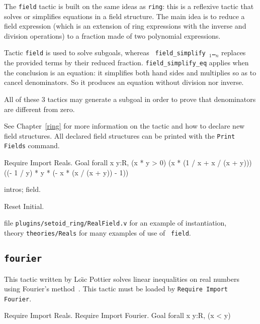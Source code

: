 \begin{coq_example*}
The {\tt field} tactic is built on the same ideas as {\tt ring}: this
is a reflexive tactic that solves or simplifies equations in a field
structure. The main idea is to reduce a field expression (which is an
extension of ring expressions with the inverse and division
operations) to a fraction made of two polynomial expressions.

Tactic {\tt field} is used to solve subgoals, whereas {\tt
  field\_simplify \term$_1$\dots\term$_n$} replaces the provided terms
by their reduced fraction. {\tt field\_simplify\_eq} applies when the
conclusion is an equation: it simplifies both hand sides and multiplies
so as to cancel denominators. So it produces an equation without
division nor inverse.

All of these 3 tactics may generate a subgoal in order to prove that
denominators are different from zero.

See Chapter~\ref{ring} for more information on the tactic and how to
declare new field structures.  All declared field structures can be
printed with the {\tt Print Fields} command.

\Example
\begin{coq_example*}
Require Import Reals.
Goal forall x y:R,
    (x * y > 0)%
    (x * (1 / x + x / (x + y)))%
    ((- 1 / y) * y * (- x * (x / (x + y)) - 1))%
\end{coq_example*}

\begin{coq_example}
intros; field.
\end{coq_example}

\begin{coq_eval}
Reset Initial.
\end{coq_eval}

\SeeAlso file {\tt plugins/setoid\_ring/RealField.v} for an example of instantiation,\\
\phantom{\SeeAlso}theory {\tt theories/Reals} for many examples of use of {\tt
field}.

\subsection{\tt fourier}

This tactic written by Lo{\"\i}c Pottier solves linear inequalities on
real numbers using Fourier's method~\cite{Fourier}. This tactic must
be loaded by {\tt Require Import Fourier}.

\Example
\begin{coq_example*}
Require Import Reals.
Require Import Fourier.
Goal forall x y:R, (x < y)%
\end{coq_example*}


\end{coq_example*}

